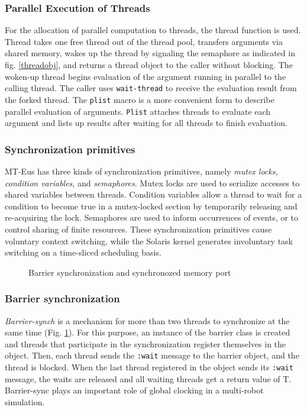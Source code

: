 \subsubsection{Parallel Execution of Threads}
For the allocation of parallel computation to threads, the thread function
is used.
Thread takes one free thread out of the thread pool,
transfers arguments via shared memory, wakes up the thread by signaling
the semaphore as indicated in fig. \ref{threadobj},
and returns a thread object to the caller without blocking.
The woken-up thread begins evaluation of
the argument running in parallel to the calling thread.
The caller uses
{\tt wait-thread} to receive the evaluation result from the forked thread.
The {\tt plist} macro is a more convenient form to describe parallel 
evaluation of arguments.
{\tt Plist} attaches threads to evaluate each argument
and lists up results after waiting for all threads to finish evaluation.

\subsubsection{Synchronization primitives}
MT-Eus has three kinds of synchronization primitives,
namely {\em mutex locks, condition variables}, and {\em semaphores}.
Mutex locks  are used to serialize accesses to shared variables
between threads.
Condition variables allow a thread to wait for a condition to become
true in a mutex-locked section by temporarily releasing and re-acquiring 
the lock.
Semaphores are used to inform occurrences of events, or to control
sharing of finite resources.
These synchronization primitives cause voluntary context switching,
while the Solaris kernel generates involuntary task switching
on a time-sliced scheduling basis.

\begin{figure}
\begin{center}
\caption{Barrier synchronization and synchronozed memory port}
\label{synchports}
\end{center}
\end{figure}

\subsubsection{Barrier synchronization}
{\em Barrier-synch} is a mechanism for more than two threads to synchronize
at the same time (Fig. \ref{synchports}).
For this purpose, an instance of the barrier class
is created and threads that participate in
the synchronization register themselves in the object.
Then, each thread sends the {\tt :wait} message to the barrier object,
and the thread is blocked.
When the last thread registered in the object sends its
{\tt :wait} message, the waits are released and all waiting
threads get a return value of T.
Barrier-sync plays an important role of global clocking in a
multi-robot simulation.

